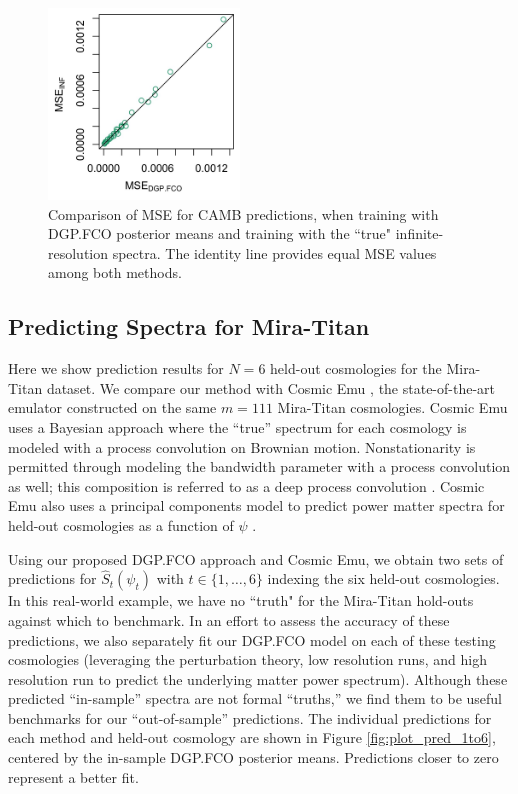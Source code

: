 \documentclass[11pt]{article}
\begin{document}
\begin{figure}
    \centering
    \includegraphics[width=2in]{mse_dot.jpeg}
    \caption{Comparison of MSE for CAMB predictions, when training with DGP.FCO posterior 
             means and training with the ``true" infinite-resolution spectra. The identity line 
             provides equal MSE values among both methods.}   
    \label{fig:mse_camb}
\end{figure}

\subsection{Predicting Spectra for Mira-Titan}
\label{subsec:mira_pred}

Here we show prediction results for $N=6$ held-out cosmologies for the Mira-Titan dataset. 
We compare our method with Cosmic Emu \citep{moran2023mira}, the state-of-the-art emulator 
constructed on the same $m=111$ Mira-Titan cosmologies. Cosmic Emu uses a Bayesian approach 
where the ``true'' spectrum for each cosmology is modeled with a process convolution on Brownian motion. 
Nonstationarity is permitted through modeling the bandwidth parameter with a process 
convolution as well; this composition is referred to as a deep process convolution 
\citep[DPC;][]{moran2023mira}. Cosmic Emu also uses a principal components model to predict power matter 
spectra for held-out cosmologies as a function of $\psi$ \citep{gattiker2020sepia}.

Using our proposed DGP.FCO approach and Cosmic Emu, we obtain two sets of predictions for $\hat{S}_t(\psi_t)$ 
with $t\in\{1,\ldots,6\}$ indexing the six held-out cosmologies.  In this real-world example, we have
no ``truth" for the Mira-Titan hold-outs against which to benchmark. In an effort to assess the 
accuracy of these predictions, we also separately fit our DGP.FCO model on each of these testing cosmologies
(leveraging the perturbation theory, low resolution runs, and high resolution run to predict the underlying
matter power spectrum).  Although these predicted ``in-sample'' spectra are not formal ``truths,'' we find them to be
useful benchmarks for our ``out-of-sample'' predictions.  The individual predictions for each method and 
held-out cosmology are shown in Figure \ref{fig:plot_pred_1to6}, centered by the in-sample DGP.FCO
posterior means.  Predictions closer to zero represent a better fit. 
\end{document}
